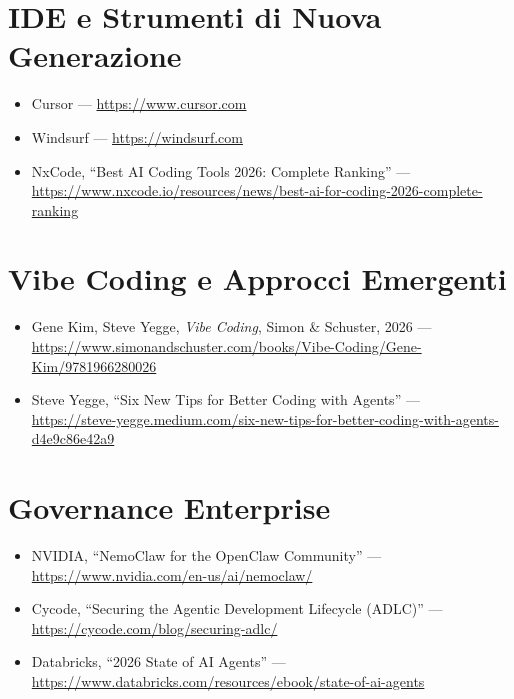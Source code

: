 \section{IDE e Strumenti di Nuova Generazione}

\begin{itemize}
  \item Cursor --- \url{https://www.cursor.com}
  \item Windsurf --- \url{https://windsurf.com}
  \item NxCode, ``Best AI Coding Tools 2026: Complete Ranking'' ---\\
    \url{https://www.nxcode.io/resources/news/best-ai-for-coding-2026-complete-ranking}
\end{itemize}

\section{Vibe Coding e Approcci Emergenti}

\begin{itemize}
  \item Gene Kim, Steve Yegge, \textit{Vibe Coding}, Simon \& Schuster, 2026 ---\\
    \url{https://www.simonandschuster.com/books/Vibe-Coding/Gene-Kim/9781966280026}
  \item Steve Yegge, ``Six New Tips for Better Coding with Agents'' ---\\
    \url{https://steve-yegge.medium.com/six-new-tips-for-better-coding-with-agents-d4e9c86e42a9}
\end{itemize}

\section{Governance Enterprise}

\begin{itemize}
  \item NVIDIA, ``NemoClaw for the OpenClaw Community'' ---\\
    \url{https://www.nvidia.com/en-us/ai/nemoclaw/}
  \item Cycode, ``Securing the Agentic Development Lifecycle (ADLC)'' ---\\
    \url{https://cycode.com/blog/securing-adlc/}
  \item Databricks, ``2026 State of AI Agents'' ---\\
    \url{https://www.databricks.com/resources/ebook/state-of-ai-agents}
\end{itemize}

